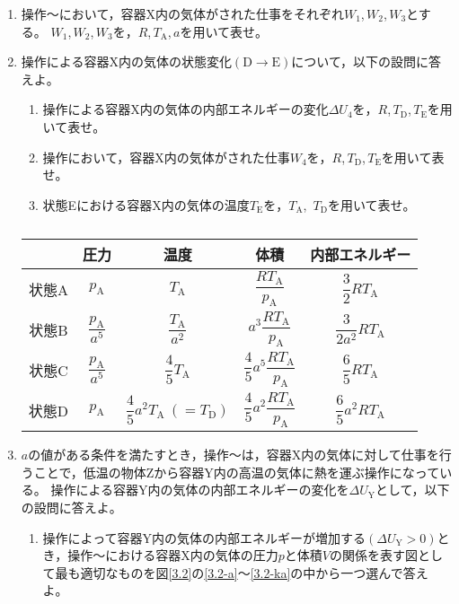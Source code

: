 \documentclass[b5paper, papersize, fleqn, 11pt, dvipdfmx, bold, nodots]{jsarticle}
\begin{document}
\begin{enumerate}[label=\Roman*, itemindent=1zw]
  \item 操作〜において，容器X内の気体がされた仕事をそれぞれ$W_1$,\,$W_2$,\,$W_3$とする。
  $W_1$,\,$W_2$,\,$W_3$を，$R$,\,$T_\text{A}$,\,$a$を用いて表せ。

  \item 操作による容器X内の気体の状態変化$(\mathrm{D\to E})$について，以下の設問に答えよ。
  \begin{enumerate}[label=\Kakko*]
    \item 操作による容器X内の気体の内部エネルギーの変化$\varDelta U_4$を，$R$,\,$T_\text{D}$,\,$T_\text{E}$を用いて表せ。
    \item 操作において，容器X内の気体がされた仕事$W_4$を，$R$,\,$T_\text{D}$,\,$T_\text{E}$を用いて表せ。
    \item 状態Eにおける容器X内の気体の温度$T_\text{E}$を，$T_\text{A}$,\, $T_\text{D}$を用いて表せ。
  \end{enumerate}

  \newpage

  \begin{table}[ht]
    \centering
    \caption{}
    \label{t3.1}
    \begin{tabular}{|c|c|c|c|c|}\hline
      & 圧力 & 温度 & 体積 & 内部エネルギー \\\hline
      状態A & $p_\text{A}$ & $T_\text{A}$ & $\dfrac{RT_\text{A}}{p_\text{A}}$ & $\dfrac{3}{2}RT_\text{A}$ \rule[-12pt]{0pt}{30pt} \\\hline
      状態B & $\dfrac{p_\text{A}}{a^5}$ & $\dfrac{T_\text{A}}{a^2}$ & $a^3\dfrac{RT_\text{A}}{p_\text{A}}$ & $\dfrac{3}{2a^2}RT_\text{A}$ \rule[-12pt]{0pt}{30pt} \\\hline
      状態C & $\dfrac{p_\text{A}}{a^5}$ & $\dfrac{4}{5}T_\text{A}$ & $\dfrac{4}{5}a^5\dfrac{RT_\text{A}}{p_\text{A}}$ & $\dfrac{6}{5}RT_\text{A}$ \rule[-12pt]{0pt}{30pt} \\\hline
      状態D & $p_\text{A}$ & $\dfrac{4}{5}a^2T_\text{A}\ (=T_\text{D})$ & $\dfrac{4}{5}a^2\dfrac{RT_\text{A}}{p_\text{A}}$ & $\dfrac{6}{5}a^2RT_\text{A}$ \rule[-12pt]{0pt}{30pt} \\\hline
    \end{tabular}
  \end{table}

  \newpage

  \item $a$の値がある条件を満たすとき，操作〜は，容器X内の気体に対して仕事を行うことで，低温の物体Zから容器Y内の高温の気体に熱を運ぶ操作になっている。
  操作による容器Y内の気体の内部エネルギーの変化を$\varDelta U_\text{Y}$として，以下の設問に答えよ。
  \begin{enumerate}[label=\Kakko*]
    \item 操作によって容器Y内の気体の内部エネルギーが増加する$(\varDelta U_\text{Y}>0)$とき，操作〜における容器X内の気体の圧力$p$と体積$V$の関係を表す図として最も適切なものを図\ref{3.2}の\ref{3.2-a}〜\ref{3.2-ka}の中から一つ選んで答えよ。


\end{enumerate}
\end{enumerate}
\end{document}
